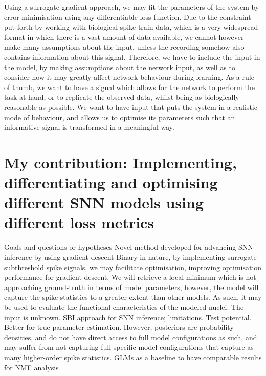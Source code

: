 \documentclass[mphil,deptreport,ai]{infthesis} %
\begin{document}
Using a surrogate gradient approach, we may fit the parameters of the system by error minimisation using any differentiable loss function. Due to the constraint put forth by working with biological spike train data, which is a very widespread format in which there is a vast amount of data available, we cannot however make many assumptions about the input, unless the recording somehow also contains information about this signal. 
Therefore, we have to include the input in the model, by making assumptions about the network input, as well as to consider how it may greatly affect network behaviour during learning. As a rule of thumb, we want to have a signal which allows for the network to perform the task at hand, or to replicate the observed data, whilst being as biologically reasonable as possible.
We want to have input that puts the system in a realistic mode of behaviour, and allows us to optimise its parameters such that an informative signal is transformed in a meaningful way.




\section{My contribution: Implementing, differentiating and optimising different SNN models using different loss metrics}

Goals and questions or hypotheses
Novel method developed for advancing SNN inference by using gradient descent
Binary in nature, by implementing surrogate subthreshold spike signals, we may facilitate optimisation, improving optimisation performance for gradient descent.
We will retrieve a local minimum which is not approaching ground-truth in terms of model parameters, however, the model will capture the spike statistics to a greater extent than other models. As such, it may be used to evaluate the functional characteristics of the modeled nuclei.
The input is unknown.
SBI approach for SNN inference; limitations. Test potential.
Better for true parameter estimation. However,  posteriors are probability densities, and do not have direct access to full model configurations as such, and may suffer from not capturing full specific model configurations that capture as many higher-order spike statistics.
GLMs as a baseline to have comparable results for NMF analysis
\end{document}
